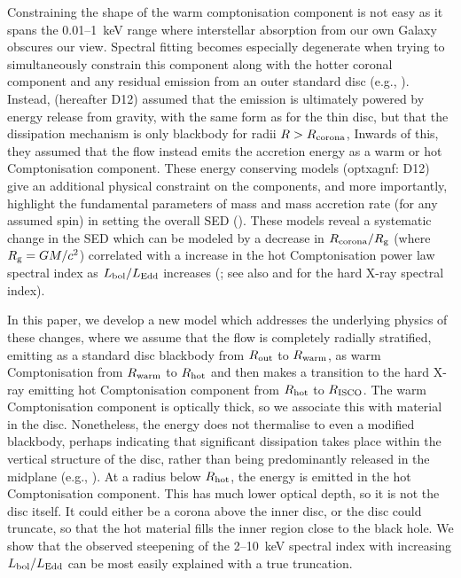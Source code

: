 \documentclass[a4paper,fleqn,usenatbib]{mnras}
\begin{document}
Constraining the shape of the warm comptonisation component is not
easy as it spans the 0.01--1~keV range where interstellar absorption
from our own Galaxy obscures our view.  Spectral fitting becomes
especially degenerate when trying to simultaneously constrain this
component along with the hotter coronal component and any residual
emission from an outer standard disc (e.g.,
\citealt{jin2009}). Instead, \cite{done2012} (hereafter D12) assumed
that the emission is ultimately powered by energy release from
gravity, with the same form as for the thin disc, but that the
dissipation mechanism is only blackbody for radii $R>R_{\rm corona}$,
Inwards of
this, they assumed that the flow instead emits the accretion energy as
a warm or hot Comptonisation component.  These energy conserving
models ({\sc optxagnf}: D12) give an additional physical constraint on
the components, and more importantly, highlight the fundamental
parameters of mass and mass accretion rate (for any assumed spin) in
setting the overall SED
(\citealt{jin2012a,jin2012b,ezhikode2017}). These models reveal a
systematic change in the SED which can be modeled by a decrease in
$R_{\rm corona}/R_{\rm g}$  (where $R_{\rm
    g}=GM/c^2$) correlated with a increase in the hot Comptonisation
power law spectral index as $L_{\rm bol}/L_{\rm Edd}$ increases
(\citealt{jin2012a,jin2012b,ezhikode2017}; see also
\citealt{shemmer2006,shemmer2008} and
\citealt{vasudevan2007,vasudevan2009} for the hard X-ray spectral
index).

In this paper, we develop a new model which addresses the underlying physics of
these changes, where we assume that the flow is completely radially
stratified, emitting as a standard disc blackbody from $R_{\rm out}$ to 
$R_{\rm warm}$, as warm Comptonisation from $R_{\rm warm}$ to $R_{\rm hot}$
and then makes a transition to the hard X-ray emitting hot
Comptonisation component from $R_{\rm hot}$ to $R_{\rm ISCO}$.  
The warm Comptonisation component is optically thick, so we associate this with
material in the disc. Nonetheless, the energy does not 
thermalise to even a modified blackbody, perhaps indicating that
significant dissipation takes place within the vertical structure of
the disc, rather than being predominantly released in the midplane
(e.g., \citealt{davis2005}).
At a radius below $R_{\rm hot}$, 
the energy is emitted in the hot Comptonisation component. This
has much lower optical depth, so it is not the disc itself. It could
either be a corona above the inner disc, or the disc 
could truncate, so that the hot material fills the inner region close
to the black hole. We show that the observed steepening of the 2--10~keV
spectral index with increasing $L_{\rm bol}/L_{\rm Edd}$ can be most easily
explained with a true truncation. 
\end{document}
